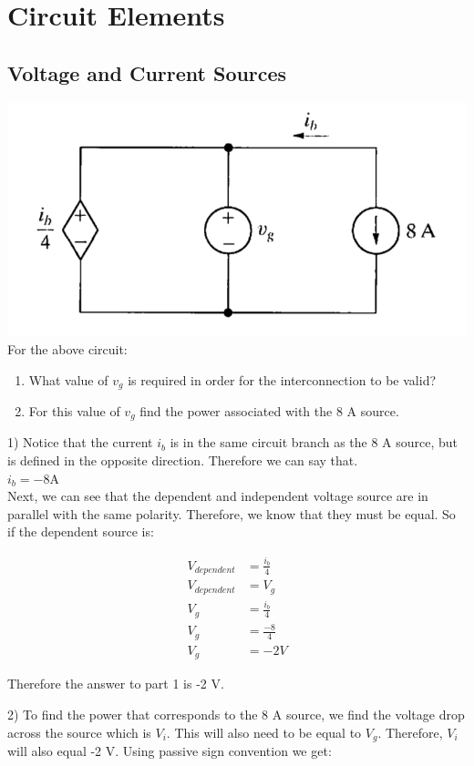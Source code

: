 \newpage
\section{Circuit Elements}

\subsection{Voltage and Current Sources}

\includegraphics[scale=0.25]{img/c2/p1}
For the above circuit:
\begin{enumerate}
	\item What value of $v_g$ is required in order for the interconnection to be valid?
	\item For this value of $v_g$ find the power associated with the 8 A source.
\end{enumerate}

1) Notice that the current $i_b$ is in the same circuit branch as the 8 A source, but is defined
in the opposite direction. Therefore we can say that.
\\ \( i_b = -8\)A
\\Next, we can see that the dependent and independent voltage source are in parallel with the same
polarity. Therefore, we know that they must be equal. So if the dependent source is:

\begin{align*}
	V_{dependent} &= \frac{i_b}{4}
	\\ V_{dependent} &= V_g
	\\ V_g &= \frac{i_b}{4}
	\\ V_g &= \frac{-8}{4}
	\\ V_g &= -2V
\end{align*}

Therefore the answer to part 1 is -2 V. 


2) To find the power that corresponds to the 8 A source, we find the voltage drop across the source
which is $V_i$. This will also need to be equal to $V_g$. Therefore, $V_i$ will also equal -2 V.
Using passive sign convention we get:

